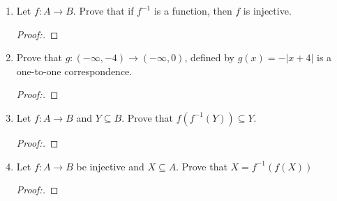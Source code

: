 \documentclass[11pt]{article}
\begin{document}
\begin{enumerate}
    \item Let $f:A\xrightarrow{} B$. Prove that if $f^{-1}$ is a function, then $f$ is injective.
       \begin{proof}[Proof:\nopunct]
        \end{proof}
        
    \item Prove that $g:(-\infty, -4)\rightarrow(-\infty,0)$, defined by $g(x) = -|x+4|$ is a one-to-one correspondence.
       \begin{proof}[Proof:\nopunct]
        \end{proof}
        
    \item Let $f:A \rightarrow B$ and $Y \subseteq B.$ Prove that $f(f^{-1}(Y)) \subseteq Y.$
        \begin{proof}[Proof:\nopunct]
        \end{proof}
        
    \item Let $f:A \rightarrow B$ be injective and $X \subseteq A.$ \newline Prove that $X = f^{-1}(f(X))$ 
        \begin{proof}[Proof:\nopunct]
        \end{proof}
    
\end{enumerate}
\end{document}
